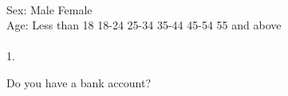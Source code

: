 \documentclass[a5paper]{sdapsclassic}
\begin{document}
\begin{questionnaire}
		\textcolor{black}{\mytextbox{}{1mm}{5mm}{2mm}{0mm}\hspace{1pt}}%
		\textcolor{black}{\mytextbox{}{1mm}{5mm}{2mm}{0mm}\hspace{1pt}}%
		\textcolor{black}{\mytextbox{}{1mm}{5mm}{2mm}{0mm}\hspace{1pt}}%
		\textcolor{black}{\mytextbox{}{1mm}{5mm}{2mm}{0mm}\hspace{1pt}}%
		\textcolor{black}{\mytextbox{}{1mm}{5mm}{2mm}{0mm}\hspace{1pt}}%
		\textcolor{black}{\mytextbox{}{1mm}{5mm}{2mm}{0mm}\hspace{1pt}}%
		\textcolor{black}{\mytextbox{}{1mm}{5mm}{2mm}{0mm}\hspace{1pt}}%
		\textcolor{black}{\mytextbox{}{1mm}{5mm}{2mm}{0mm}\hspace{1pt}}%
		\textcolor{black}{\mytextbox{}{1mm}{5mm}{2mm}{0mm}\hspace{1pt}}%
		\textcolor{black}{\mytextbox{}{1mm}{5mm}{2mm}{0mm}}%
		\hspace{5pt}%
		\\
		Sex: \hspace{4pt}%
		\textcolor{black}{\mycheckbox{}{}}Male\hspace{5pt}%
		\textcolor{black}{\mycheckbox{}{}}Female%
		\\
		Age:\hspace{6pt}%
		\textcolor{black}{\mycheckbox{}{}}Less than 18\hspace{5pt}%
		\textcolor{black}{\mycheckbox{}{}} 18-24\hspace{5pt}%
		\textcolor{black}{\mycheckbox{}{}} 25-34\hspace{5pt}%
		\textcolor{black}{\mycheckbox{}{}} 35-44\hspace{5pt}%
		\textcolor{black}{\mycheckbox{}{}} 45-54\hspace{5pt}%
		\textcolor{black}{\mycheckbox{}{}} 55 and above%
		\\
		\\
		1.\hspace{4pt}\begin{minipage}{29em}Do you have a bank account? \end{minipage}

\end{questionnaire}
\end{document}
